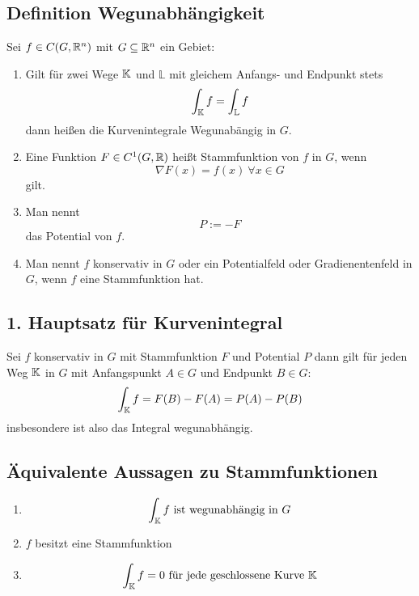 \subsection{Definition Wegunabhängigkeit}
Sei $f\in C(G, \mathbb{R}^n)$ mit $G \subseteq \mathbb{R}^n$ ein Gebiet:
\begin{enumerate}[label= (\alph*)]
    \item Gilt für zwei Wege $\mathbb{K}$ und $\mathbb{L}$ mit gleichem Anfangs- und
        Endpunkt stets
        \begin{equation*}
            \int_{\mathbb{K}} f = \int_{\mathbb{L}} f
        \end{equation*}
        dann heißen die Kurvenintegrale Wegunabängig in $G$.
    \item Eine Funktion $F \in C^1(G,\mathbb{R})$ heißt Stammfunktion von $f$ in $G$, wenn
        \begin{equation*}
            \nabla F(x) = f(x)\ \forall x \in G
        \end{equation*}
        gilt.
    \item Man nennt
        \begin{equation*}
            P := -F
        \end{equation*}
        das Potential von $f$.
    \item Man nennt $f$ konservativ in $G$ oder ein Potentialfeld oder Gradienentenfeld
        in $G$, wenn $f$ eine Stammfunktion hat.
\end{enumerate}

\subsection{1. Hauptsatz für Kurvenintegral}
Sei $f$ konservativ in $G$ mit Stammfunktion $F$ und Potential $P$ dann gilt
für jeden Weg $\mathbb{K}$ in $G$ mit Anfangspunkt $A \in G$ und Endpunkt $B \in G$:
\begin{equation*}
    \int_{\mathbb{K}} f = F(B) - F(A) = P(A) - P(B)
\end{equation*}
insbesondere ist also das Integral wegunabhängig.

\subsection{Äquivalente Aussagen zu Stammfunktionen}
\begin{enumerate}[label= (\alph*)]
    \item
        \begin{equation*}
            \int_{\mathbb{K}} f \text{ ist wegunabhängig in } G
        \end{equation*}
    \item
        $f$ besitzt eine Stammfunktion
    \item
        \begin{equation*}
            \int_{\mathbb{K}} f = 0 \text{ für jede geschlossene Kurve } \mathbb{K}
        \end{equation*}
\end{enumerate}

